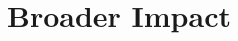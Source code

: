 \documentclass{article}
\numberwithin{equation}{section}
\begin{document}



\newpage
\section*{Broader Impact}


\newpage


\appendix

\end{document}
